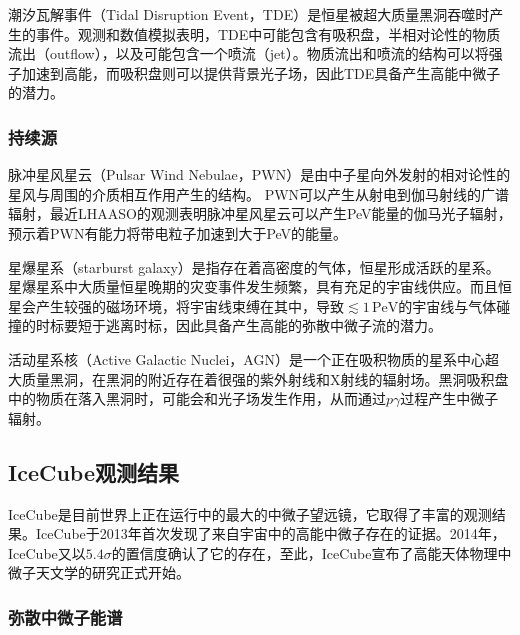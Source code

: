 潮汐瓦解事件（Tidal Disruption Event，TDE）是恒星被超大质量黑洞吞噬时产生的事件。观测和数值模拟表明，TDE中可能包含有吸积盘，半相对论性的物质流出（outflow），以及可能包含一个喷流（jet）\cite{Dai_TDE:2018}。物质流出和喷流的结构可以将强子加速到高能，而吸积盘则可以提供背景光子场，因此TDE具备产生高能中微子的潜力\cite{Wu_TDE:2021, Zheng_TDE:2022, Winter_TDE:2022}。

\subsubsection{持续源}

脉冲星风星云（Pulsar Wind Nebulae，PWN）是由中子星向外发射的相对论性的星风与周围的介质相互作用产生的结构\cite{Mitchell_PWN:2022}。
PWN可以产生从射电到伽马射线的广谱辐射，最近LHAASO的观测表明脉冲星风星云可以产生PeV能量的伽马光子辐射\cite{LHAASO_Crab:2021}，预示着PWN有能力将带电粒子加速到大于PeV的能量。

星爆星系（starburst galaxy）是指存在着高密度的气体，恒星形成活跃的星系。星爆星系中大质量恒星晚期的灾变事件发生频繁，具有充足的宇宙线供应。而且恒星会产生较强的磁场环境，将宇宙线束缚在其中，导致$\lesssim 1\,\mathrm{PeV}$的宇宙线与气体碰撞的时标要短于逃离时标，因此具备产生高能的弥散中微子流的潜力\cite{Loeb_starburst_galaxy:2006}。

活动星系核（Active Galactic Nuclei，AGN）是一个正在吸积物质的星系中心超大质量黑洞，在黑洞的附近存在着很强的紫外射线和X射线的辐射场。黑洞吸积盘中的物质在落入黑洞时，可能会和光子场发生作用，从而通过$p\gamma$过程产生中微子辐射\cite{Meszaros_AGN:2004, Murase_AGN:2015, Murase_AGN:2022, Murase_hidden_AGN:2022}。


\subsection{IceCube观测结果}

IceCube是目前世界上正在运行中的最大的中微子望远镜，它取得了丰富的观测结果。IceCube于2013年首次发现了来自宇宙中的高能中微子存在的证据\cite{IceCube_astro_neutrino_flux:2013}。2014年，IceCube又以$5.4\sigma$的置信度确认了它的存在\cite{IceCube_astro_neutrino_flux_3yr:2014}，至此，IceCube宣布了高能天体物理中微子天文学的研究正式开始。

\subsubsection{弥散中微子能谱}


